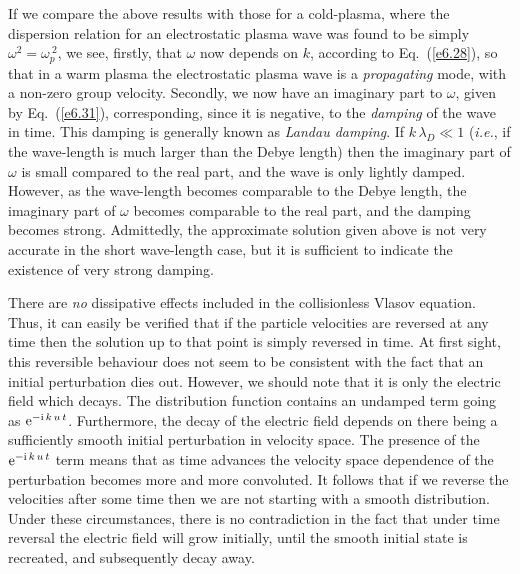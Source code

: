 If we compare the above results with those  for a cold-plasma, where
the dispersion relation for an electrostatic plasma wave was found to
be simply $\omega^2=\omega_p^{~2}$, we see, firstly,  that  $\omega$ now depends on $k$,
according to Eq.~(\ref{e6.28}), so that in a warm plasma the electrostatic plasma
wave is a {\em propagating}\/ mode, with a non-zero group velocity. Secondly,  we 
now have
an imaginary part to $\omega$, given by Eq.~(\ref{e6.31}), corresponding, since
it is negative, to the {\em damping}\/ of the wave in time. This damping is generally
known as {\em Landau damping}. If $k\,\lambda_D\ll 1$ ({\em i.e.},
if the
wave-length is much larger than the Debye length) then the imaginary part
of $\omega$ is small compared to the real part, and the wave is only
lightly damped. However, as the wave-length becomes comparable to the
Debye length, the imaginary part of $\omega$ becomes comparable to the
real part, and the damping becomes strong. 
Admittedly, the approximate solution given above
is not very accurate in the short wave-length case, but it is sufficient to indicate
the existence of very strong damping. 

There are {\em no}\/ dissipative effects included in the collisionless Vlasov equation.
Thus, it can easily be verified that if the particle velocities are
reversed at any time then the solution up to that point is simply reversed in
time. At first sight, this reversible behaviour does not seem to be
consistent with the fact that an initial perturbation dies out. However,
we should note that it is only the electric field which decays. The
distribution function contains an undamped term going as ${\rm e}^{-{\rm i}\,k\,
u\,t}$. Furthermore, the decay of the electric field depends on there being a
sufficiently smooth initial perturbation in velocity space. The presence
of the  ${\rm e}^{-{\rm i}\,k\,
u\,t}$ term means that as time advances the velocity space dependence of the
perturbation becomes more and more convoluted. It follows that if we
reverse the velocities after some time then we are not starting
with a smooth distribution. Under these circumstances, there is
no contradiction in the fact that under time reversal the electric field will
grow initially, until the smooth initial state is recreated, and subsequently
decay away. 

